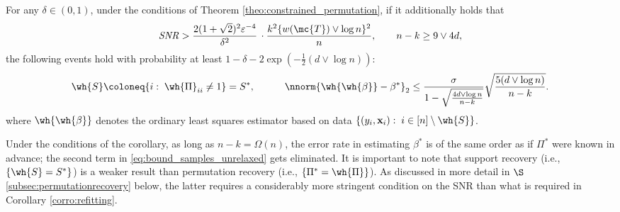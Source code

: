 \documentclass[11pt]{article}
\def\epss{\varepsilon}
\begin{document}
\begin{corro}\label{corro:refitting} For any $\delta \in (0,1)$, under the conditions of Theorem \ref{theo:constrained_permutation}, if it additionally holds that 
\begin{equation*}
\text{\emph{SNR}} > \frac{2 (1 + \sqrt{2})^2 \epss^{-4}}{\delta^2}\,\cdot \frac{k^2  \{w(\mc{T}) \vee \log n\}^2}{n}, \qquad n-k \geq 9 \vee 4d, 
\end{equation*}
the following events hold with probability at least $1 - \delta - 2\exp(-\frac{1}{2} (d \vee \log n))$:
\begin{align*}
\wh{S} \coloneq \{i:\;\wh{\Pi}_{ii} \neq 1 \} = S^*, \quad\qquad \nnorm{\wh{\wh{\beta}} - \beta^*}_2 \leq 
\frac{\sigma}{1 - \sqrt{\frac{4 d \vee \log n}{n - k}}} \sqrt{\frac{5 (d \vee \log n)}{n-k}}. 
\end{align*}
where $\wh{\wh{\beta}}$ denotes the ordinary least squares estimator based on data $\{(y_i, \mathbf{x}_i): \; i
\in [n] \setminus \wh{S} \}$.
\end{corro}
\noindent Under the conditions of the corollary, as long as $n - k = \Omega(n)$, the error rate in estimating $\beta^*$ is of the same order as if $\Pi^*$ were known in advance; the second term in \eqref{eq:bound_samples_unrelaxed} gets eliminated. It is important to note that support recovery (i.e., $\{\wh{S} = S^* \}$) is a weaker result than permutation recovery (i.e., $\{\Pi^* = \wh{\Pi} \}$). As discussed in more detail in $\S$\ref{subsec:permutationrecovery} below, the latter requires a considerably more stringent condition on the SNR than what is required in Corollary \ref{corro:refitting}.
\end{document}
